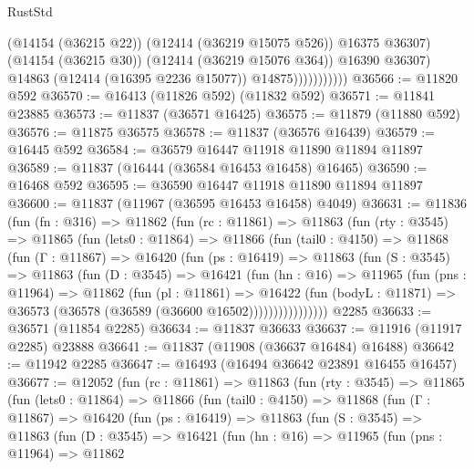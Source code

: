\begin{lexlean}{RustStd}
\begin{coremodule}
{\begin{coremodule}
{{{{{{{{{{{{{{{{{{{{{{{{{{{{{{{{{{{{{{{{{{{{{{{{{{                              (@14154 (@36215 @22))
                              (@12414 (@36219 @15075 @526))
                              @16375
                              @36307)
                            (@14154 (@36215 @30))
                            (@12414 (@36219 @15076 @364))
                            @16390
                            @36307)
                          @14863
                          (@12414 (@16395 @2236 @15077))
                          @14875)))))))))))
@36566 := @11820 @592
@36570 := @16413 (@11826 @592) (@11832 @592)
@36571 := @11841 @23885
@36573 := @11837 (@36571 @16425)
@36575 := @11879 (@11880 @592)
@36576 := @11875 @36575
@36578 := @11837 (@36576 @16439)
@36579 := @16445 @592
@36584 := @36579 @16447 @11918 @11890 @11894 @11897
@36589 := @11837 (@16444 (@36584 @16453 @16458) @16465)
@36590 := @16468 @592
@36595 := @36590 @16447 @11918 @11890 @11894 @11897
@36600 := @11837 (@11967 (@36595 @16453 @16458) @4049)
@36631 := @11836
    (fun (fn : @316) =>
    @11862
      (fun (rc : @11861) =>
      @11863
        (fun (rty : @3545) =>
        @11865
          (fun (lets0 : @11864) =>
          @11866
            (fun (tail0 : @4150) =>
            @11868
              (fun (Γ : @11867) =>
              @16420
                (fun (ps : @16419) =>
                @11863
                  (fun (S : @3545) =>
                  @11863
                    (fun (D : @3545) =>
                    @16421
                      (fun (hn : @16) =>
                      @11965
                        (fun (pns : @11964) =>
                        @11862
                          (fun (pl : @11861) =>
                          @16422
                            (fun (bodyL : @11871) =>
                            @36573 (@36578 (@36589 (@36600 @16502))))))))))))))))
    @2285
@36633 := @36571 (@11854 @2285)
@36634 := @11837 @36633
@36637 := @11916 (@11917 @2285) @23888
@36641 := @11837 (@11908 (@36637 @16484) @16488)
@36642 := @11942 @2285
@36647 := @16493 (@16494 @36642 @23891 @16455 @16457)
@36677 := @12052
    (fun (rc : @11861) =>
    @11863
      (fun (rty : @3545) =>
      @11865
        (fun (lets0 : @11864) =>
        @11866
          (fun (tail0 : @4150) =>
          @11868
            (fun (Γ : @11867) =>
            @16420
              (fun (ps : @16419) =>
              @11863
                (fun (S : @3545) =>
                @11863
                  (fun (D : @3545) =>
                  @16421
                    (fun (hn : @16) =>
                    @11965
                      (fun (pns : @11964) =>
                      @11862
}}}}}}}}}}}}}}}}}}}}}}}}}}}}}}}}}}}}}}}}}}}}}}}}}}
\end{coremodule}}
\end{coremodule}
\end{lexlean}
